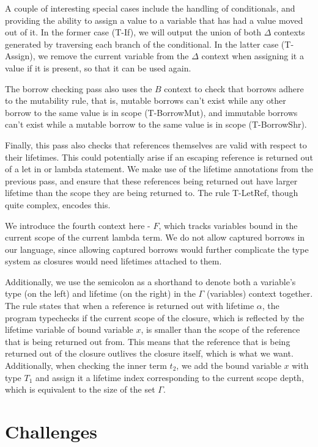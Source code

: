 \documentclass[letterpaper,11pt]{article}
\begin{document}
A couple of interesting special cases include the handling of conditionals,
and providing the ability to assign a value to a variable that has had a value
moved out of it. In the former case (T-If), we will output the union of both $\Delta$
contexts generated by traversing each branch of the conditional. In the latter case (T-Assign),
we remove the current variable from the $\Delta$ context when assigning it a value
if it is present, so that it can be used again.

The borrow checking pass also uses the $B$ context to check that borrows adhere to
the mutability rule, that is, mutable borrows can't exist while any other borrow
to the same value is in scope (T-BorrowMut), and immutable borrows can't exist while a mutable
borrow to the same value is in scope (T-BorrowShr).

Finally, this pass also checks that references themselves are valid with respect
to their lifetimes. This could potentially arise if an escaping reference is returned
out of a let in or lambda statement. We make use of the lifetime annotations from
the previous pass, and ensure that these references being returned out have
larger lifetime than the scope they are being returned to. The rule T-LetRef,
though quite complex, encodes this.

We introduce the fourth context here - $F$, which tracks variables bound in the current
scope of the current lambda term. We do not allow captured borrows in our language, since allowing captured borrows 
would further complicate the type system as closures would need lifetimes attached to them.

Additionally, we use the semicolon as a shorthand to denote both a variable's type (on the left) and lifetime (on the right) in
the $\Gamma$ (variables) context together. The rule states that
when a reference is returned out with lifetime $\alpha$, the program typechecks
if the current scope of the closure, which is reflected by the lifetime variable
of bound variable $x$, is smaller than the scope of the reference that is being
returned out from. This means that the reference that is being returned out of
the closure outlives the closure itself, which is what we want. Additionally, when checking
the inner term $t_2$, we add the bound variable $x$ with type $T_1$ and assign it a lifetime index
corresponding to the current scope depth, which is equivalent to the size of the set $\Gamma$.

\section{Challenges}
\end{document}
